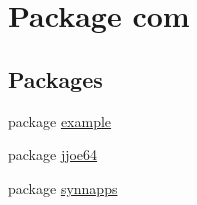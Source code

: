 \hypertarget{namespacecom}{}\section{Package com}
\label{namespacecom}
\subsection*{Packages}
\begin{DoxyCompactItemize}
\item 
package \mbox{\hyperlink{namespacecom_1_1example}{example}}
\item 
package \mbox{\hyperlink{namespacecom_1_1jjoe64}{jjoe64}}
\item 
package \mbox{\hyperlink{namespacecom_1_1synnapps}{synnapps}}
\end{DoxyCompactItemize}
